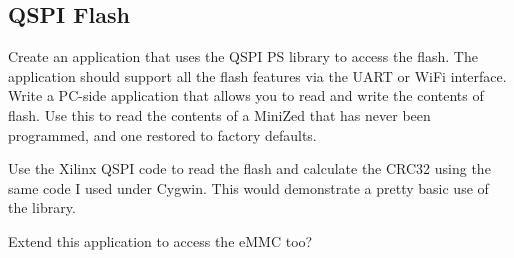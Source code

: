 \subsection{QSPI Flash}

Create an application that uses the QSPI PS library to access the flash.
The application should support all the flash features via the UART or
WiFi interface. Write a PC-side application that allows you to read
and write the contents of flash. Use this to read the contents of
a MiniZed that has never been programmed, and one restored to factory
defaults.

Use the Xilinx QSPI code to read the flash and calculate the CRC32 using
the same code I used under Cygwin. This would demonstrate a pretty basic
use of the library.

Extend this application to access the eMMC too?